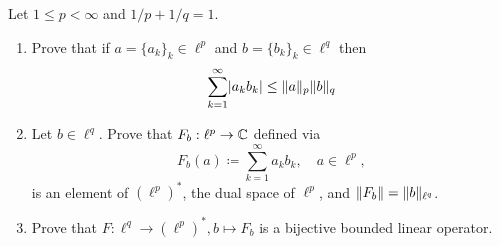 \documentclass[a4paper, 10pt]{article}
\begin{document}
\begin{problem} [\done]
    Let $1 \leq p < \infty$ and $1/p + 1/q = 1$. \begin{enumerate}
    \item Prove that if $a = \{a_k\}_{k} \in \ell^p$ and $b = \{b_k\}_k \in \ell^q$ then \begin{equation*}
    \sum_{k=1}^{\infty} \lvert a_k b_k\rvert \leq \lVert a\rVert_p \lVert b\rVert_q
    \end{equation*}
    \item Let $b \in \ell^q$. Prove that $F_b: \ell^p \to \mathbb{C}$ defined via
    \begin{equation*}
    F_b(a) \coloneqq \sum_{k=1}^{\infty} a_k b_k, \quad a\in \ell^p,
    \end{equation*}
    is an element of $(\ell^p)^*$, the dual space of $\ell^p$, and $\lVert F_b\rVert = \lVert b\rVert_{\ell^q}$.
    \item Prove that $F: \ell^q \to {(\ell^p)}^*, b \mapsto F_b$ is a bijective bounded linear operator.
    \end{enumerate}
\end{problem}
\end{document}
